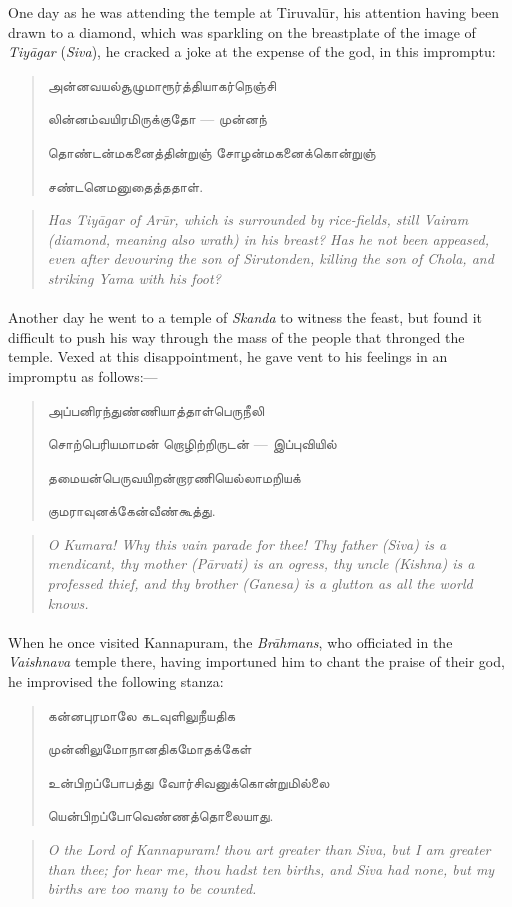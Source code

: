 \documentclass{article}
\newcommand{\TamilText}[1]{\texttamil{#1}}
\newcommand{\tam}[1]{\TamilText{#1}}
\begin{document}
One day as he was attending the temple at Tiruval\={u}r, his attention having been drawn to a diamond, which was sparkling on the breastplate of the image of \emph{Tiy\={a}gar} (\emph{Siva}), he cracked a joke at the expense of the god, in this impromptu:
\begin{quotation}\small
\tam{அன்னவயல்சூழுமாரூர்த்தியாகர்நெஞ்சி}

\tam{லின்னம்‌வயிரமிருக்குதோ} --- \tam{முன்னந்}

\tam{தொண்டன்மகனைத்தின்றுஞ்‌ சோழன்மகனைக்கொன்றுஞ்}

\tam{சண்டனெமனுதைத்‌ததாள்‌}.
\end{quotation}
\begin{quotation}\small
\emph{Has Tiy\={a}gar of Ar\={u}r, which is surrounded by rice-fields, still Vairam (diamond, meaning also wrath) in his breast? Has he not been appeased, even after devouring the son of Sirutonden, killing the son of Chola, and striking Yama with his foot?}
\end{quotation}
\paragraph{}
Another day he went to a temple of \emph{Skanda} to witness the feast, but found it difficult to push his way through the mass of the people that thronged the temple. Vexed at this disappointment, he gave vent to his feelings in an impromptu as follows:---
\begin{quotation}\small
\tam{அப்பனிரந்துண்ணியாத்தாள்பெருநீலி}

\tam{சொற்பெரியமாமன்‌ றொழிற்றிருடன்‌} --- \tam{இப்புவியில்‌}

\tam{தமையன்பெருவயிறன்றாரணியெல்லாமறியக்‌}

\tam{குமராவுனக்கேன்வீண்கூத்து}.
\end{quotation}
\begin{quotation}\small
\emph{O Kumara! Why this vain parade for thee! Thy father (Siva) is a mendicant, thy mother (P\={a}rvati) is an ogress, thy uncle (Kishna) is a professed thief, and thy brother (Ganesa) is a glutton as all the world knows.}
\end{quotation}
\paragraph{}
When he once visited Kannapuram, the \emph{Br\={a}hmans}, who officiated in the \emph{Vaishnava} temple there, having importuned him to chant the praise of their god, he improvised the following stanza:
\begin{quotation}\small
\tam{கன்னபுரமாலே கடவுளிலுநீயதிக}

\tam{முன்னிலுமோநானதிகமோதக்கேள்‌}

\tam{உன்பிறப்போபத்து வோர்சிவனுக்கொன்றுமில்லை}

\tam{யென்பிறப்போவெண்ணத்தொலையாது}.
\end{quotation}
\begin{quotation}\small
\emph{O the Lord of Kannapuram! thou art greater than Siva, but I am greater than thee; for hear me, thou hadst ten births, and Siva had none, but my births are too many to be counted.}
\end{quotation}
\end{document}
